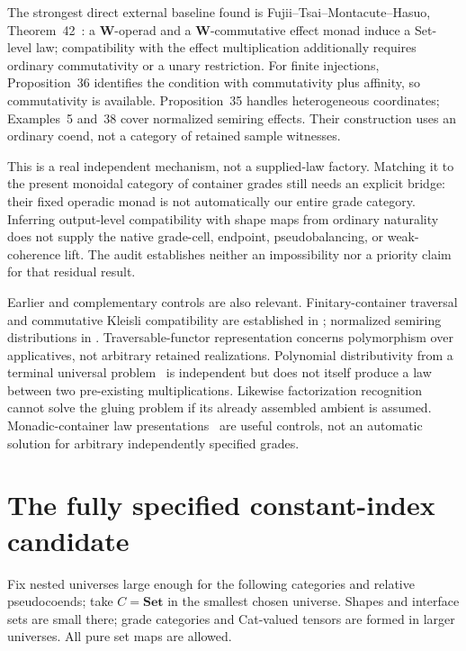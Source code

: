 \documentclass[11pt,a4paper]{article}
\newcommand{\Set}{\mathbf{Set}}
\begin{document}
The strongest direct external baseline found is Fujii--Tsai--Montacute--Hasuo,
Theorem~42~\cite{FTMH}: a $\mathbf W$-operad and a
$\mathbf W$-commutative effect monad induce a Set-level law; compatibility
with the effect multiplication additionally requires ordinary commutativity
or a unary restriction. For finite injections, Proposition~36 identifies the
condition with commutativity plus affinity, so commutativity is available.
Proposition~35 handles heterogeneous coordinates; Examples~5 and~38 cover
normalized semiring effects. Their construction uses an ordinary coend,
not a category of retained sample witnesses.

This is a real independent mechanism, not a supplied-law factory. Matching
it to the present monoidal category of container grades still needs an
explicit bridge: their fixed operadic monad is not automatically our entire
grade category. Inferring output-level compatibility with shape maps from
ordinary naturality does not supply the native grade-cell, endpoint,
pseudobalancing, or weak-coherence lift. The audit establishes neither an
impossibility nor a priority claim for that residual result.

Earlier and complementary controls are also relevant. Finitary-container
traversal and commutative Kleisli compatibility are established in
\cite[Theorem~3.7 and Lemma~4.1]{JR}; normalized semiring distributions in
\cite[Example~3.3]{Fritz}. Traversable-functor representation
\cite[Theorems~5.6 and~5.8]{JO} concerns polymorphism over applicatives, not
arbitrary retained realizations. Polynomial distributivity from a terminal
universal problem~\cite[Proposition~2.2.3]{Weber} is independent but does not
itself produce a law between two pre-existing multiplications. Likewise
factorization recognition~\cite[Theorem~3.8]{RW} cannot solve the gluing
problem if its already assembled ambient is assumed. Monadic-container law
presentations~\cite{PD} are useful controls, not an automatic solution for
arbitrary independently specified grades.

\section{The fully specified constant-index candidate}

Fix nested universes large enough for the following categories and relative
pseudocoends; take $C=\Set$ in the smallest chosen universe. Shapes and
interface sets are small there; grade categories and Cat-valued tensors are
formed in larger universes. All pure set maps are allowed.
\end{document}
